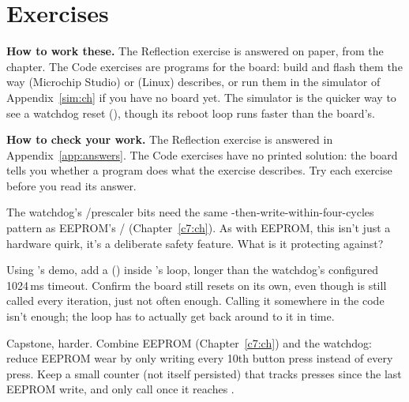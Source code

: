 
\section{Exercises}
\label{c8:sec:exercises}\label{c8:app:b}

\begin{aside}
\textbf{How to work these.} The Reflection exercise is answered on paper, from the chapter. The
Code exercises are programs for the board: build and flash them the way 
(Microchip Studio) or  (Linux) describes, or run them in the simulator of
Appendix~\ref{sim:ch} if you have no board yet. The simulator is the quicker way to see a watchdog
reset (), though its reboot loop runs faster than the board's.

\textbf{How to check your work.} The Reflection exercise is answered in
Appendix~\ref{app:answers}. The Code exercises have no printed solution: the board tells you
whether a program does what the exercise describes. Try each exercise before you read its answer.
\end{aside}

\label{c8:set:1}

\label{c8:ex:1}
The watchdog's /prescaler bits need the same -then-write-within-four-cycles
pattern as EEPROM's / (Chapter~\ref{c7:ch}). As with EEPROM, this isn't
just a hardware quirk, it's a deliberate safety feature. What is it protecting against?

\label{c8:set:2}

\label{c8:ex:2}
Using 's demo, add a  () inside
's loop, longer than the watchdog's configured 1024\,ms timeout. Confirm the board
still resets on its own, even though  is still called every iteration, just
not often enough. Calling it somewhere in the code isn't enough; the loop has to actually get back
around to it in time.

\label{c8:ex:3}
Capstone, harder. Combine EEPROM (Chapter~\ref{c7:ch}) and the watchdog: reduce EEPROM wear by
only writing every 10th button press instead of every press. Keep a small  counter
(not itself persisted) that tracks presses since the last EEPROM write, and only call
 once it reaches .


